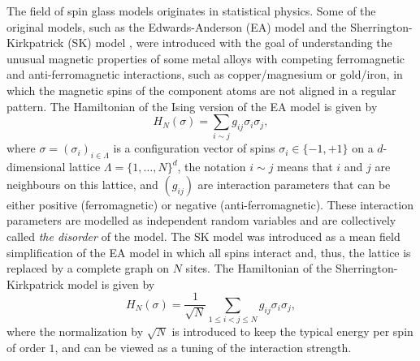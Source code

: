 \documentclass[12pt]{article}
\theoremstyle{nonumberplain}
\begin{document}
The field of spin glass models originates in statistical physics. Some of the original models, such as the Edwards-Anderson (EA) model \cite{EA} and the Sherrington-Kirkpatrick (SK) model \cite{SK}, were introduced with the goal of understanding the unusual magnetic properties of some metal alloys with competing ferromagnetic and anti-ferromagnetic interactions, such as copper/magnesium or gold/iron,  in which the magnetic spins of the component atoms are not aligned in a regular pattern. The Hamiltonian of the Ising version of the EA model is given by 
\begin{equation}
H_N(\sigma) = \sum_{i\sim j} g_{ij} \sigma_i \sigma_j,
\label{EA}
\end{equation}
where $\sigma = (\sigma_i)_{i\in \Lambda}$ is a configuration vector of spins $\sigma_i \in \{-1,+1\}$ on a $d$-dimensional lattice $\Lambda = \{1,\ldots, N\}^d$, the notation $i\sim j$ means that $i$ and $j$ are neighbours on this lattice, and $(g_{ij})$ are interaction parameters that can be either positive (ferromagnetic) or negative (anti-ferromagnetic). These interaction parameters are modelled as independent random variables and are collectively called \emph{the disorder} of the model. The SK model was introduced as a mean field simplification of the EA model in which all spins interact and, thus, the lattice is replaced by a complete graph on $N$ sites.  The Hamiltonian of the Sherrington-Kirkpatrick model is given by  
\begin{equation}
H_N(\sigma) = \frac{1}{\sqrt{N}} \sum_{1\leq i<j\leq N} g_{ij}\sigma_i \sigma_j,
\end{equation}
where the normalization by $\sqrt{N}$ is introduced to keep the typical energy per spin of order $1$, and can be viewed as a tuning of the interaction strength.
\end{document}
